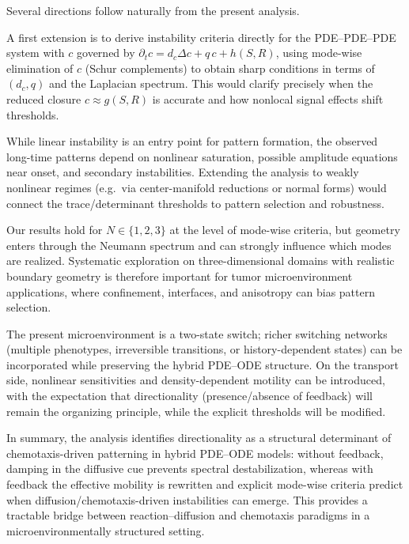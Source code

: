 \documentclass[pdflatex,sn-mathphys-ay]{sn-jnl}
\theoremstyle{thmstyleone}
\theoremstyle{definition}
\theoremstyle{remark}
\begin{document}
Several directions follow naturally from the present analysis.

A first extension is to derive instability criteria directly for the PDE--PDE--PDE system with $c$ governed by
$\partial_t c=d_c\Delta c+q\,c+h(S,R)$, using mode-wise elimination of $c$ (Schur complements) to obtain sharp conditions in terms of
$(d_c,q)$ and the Laplacian spectrum. This would clarify precisely when the reduced closure $c\approx g(S,R)$ is accurate and how nonlocal
signal effects shift thresholds.

While linear instability is an entry point for pattern formation, the observed long-time patterns depend on nonlinear saturation,
possible amplitude equations near onset, and secondary instabilities. Extending the analysis to weakly nonlinear regimes (e.g.\ via
center-manifold reductions or normal forms) would connect the trace/determinant thresholds to pattern selection and robustness.

Our results hold for $N\in\{1,2,3\}$ at the level of mode-wise criteria, but geometry enters through the Neumann spectrum and can strongly
influence which modes are realized. Systematic exploration on three-dimensional domains with realistic boundary geometry is therefore
important for tumor microenvironment applications, where confinement, interfaces, and anisotropy can bias pattern selection.

The present microenvironment is a two-state switch; richer switching networks (multiple phenotypes, irreversible transitions, or
history-dependent states) \citep{jain_dynamical_2023,friedman_hysteresis_2014} can be incorporated while preserving the hybrid PDE--ODE structure. On the transport side, nonlinear
sensitivities and density-dependent motility \citep{wang_chemotaxis_2010,hofer_dictyostelium_1995,kowalczyk_preventing_2005,choi_prevention_2010,lushnikov_macroscopic_2008} can be introduced, with the expectation that directionality (presence/absence of feedback)
will remain the organizing principle, while the explicit thresholds will be modified.

In summary, the analysis identifies directionality as a structural determinant of chemotaxis-driven patterning in hybrid PDE--ODE
models: without feedback, damping in the diffusive cue prevents spectral destabilization, whereas with feedback the effective mobility is
rewritten and explicit mode-wise criteria predict when diffusion/chemotaxis-driven instabilities can emerge. This provides a tractable
bridge between reaction--diffusion and chemotaxis paradigms in a microenvironmentally structured setting.
\end{document}
